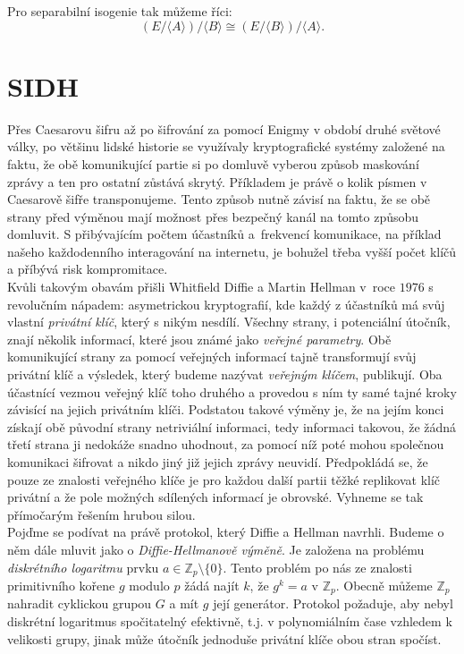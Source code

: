 \documentclass [12pt]{report}
\begin{document}
Pro separabilní isogenie tak můžeme říci:
\begin{equation*}
(E/ \langle A \rangle)/ \langle B \rangle \cong (E/ \langle B \rangle)/ \langle A \rangle.
\end{equation*}
 





\chapter{SIDH}

Přes Caesarovu šifru až po šifrování za pomocí Enigmy v období druhé světové války, po většinu lidské historie se využívaly kryptografické systémy založené na faktu, že obě komunikující partie si po domluvě vyberou způsob maskování zprávy a ten pro ostatní zůstává skrytý. Příkladem je právě o kolik písmen v Caesarově šifře transponujeme. Tento způsob nutně závisí na faktu, že se obě strany před výměnou mají možnost přes bezpečný kanál na tomto způsobu domluvit. S přibývajícím počtem účastníků a~frekvencí komunikace, na příklad našeho každodenního interagování na internetu, je bohužel třeba vyšší počet klíčů a příbývá risk kompromitace.\\

Kvůli takovým obavám přišli Whitfield Diffie a Martin Hellman v~roce $1976$ s revolučním nápadem: asymetrickou kryptografií, kde každý z účastníků má svůj vlastní \textit{privátní klíč}, který s nikým nesdílí. Všechny strany, i potenciální útočník, znají několik informací, které jsou známé jako \textit{veřejné parametry}. Obě komunikující strany za pomocí veřejných informací tajně transformují svůj privátní klíč a výsledek, který budeme nazývat \textit{veřejným klíčem}, publikují. Oba účastnící vezmou veřejný klíč toho druhého a provedou s ním ty samé tajné kroky závisící na jejich privátním klíči. Podstatou takové výměny je, že na jejím konci získají obě původní strany netriviální informaci, tedy informaci takovou, že žádná třetí strana ji nedokáže snadno uhodnout, za pomocí níž poté mohou společnou komunikaci šifrovat a nikdo jiný již jejich zprávy neuvidí. Předpokládá se, že pouze ze znalosti veřejného klíče je pro každou další partii těžké replikovat klíč privátní a že pole možných sdílených informací je obrovské. Vyhneme se tak přímočarým řešením hrubou silou.\\

Pojďme se podívat na právě protokol, který Diffie a Hellman navrhli. Budeme o něm dále mluvit jako o \textit{Diffie-Hellmanově výměně}. Je založena na problému \textit{diskrétního logaritmu} prvku $a \in \mathbb{Z}_p \setminus \lbrace 0 \rbrace$. Tento problém po nás ze znalosti primitivního kořene $g$ modulo $p$ žádá najít $k$, že $g^k = a$ v $\mathbb{Z}_p$. Obecně můžeme $\mathbb{Z}_p$ nahradit cyklickou grupou $G$ a mít $g$ její generátor. Protokol požaduje, aby nebyl diskrétní logaritmus spočitatelný efektivně, t.j. v polynomiálním čase vzhledem k velikosti grupy, jinak může útočník jednoduše privátní klíče obou stran spočíst.\\
\end{document}
